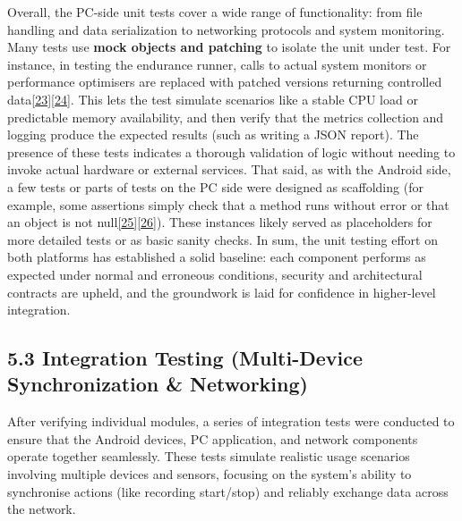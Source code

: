 \documentclass[12pt,a4paper]{article}
\begin{document}
Overall, the PC-side unit tests cover a wide range of functionality: from file handling and data serialization to networking protocols and system monitoring. Many tests use \textbf{mock objects and patching} to isolate the unit under test. For instance, in testing the endurance runner, calls to actual system monitors or performance optimisers are replaced with patched versions returning controlled data\href{https://github.com/buccancs/bucika_gsr/blob/7048f7f6a7536f5cd577ed2184800d3dad97fd08/tests/test_endurance_testing.py\#L112-L120}{{[}23{]}}\href{https://github.com/buccancs/bucika_gsr/blob/7048f7f6a7536f5cd577ed2184800d3dad97fd08/tests/test_endurance_testing.py\#L140-L148}{{[}24{]}}. This lets the test simulate scenarios like a stable CPU load or predictable memory availability, and then verify that the metrics collection and logging produce the expected results (such as writing a JSON report). The presence of these tests indicates a thorough validation of logic without needing to invoke actual hardware or external services. That said, as with the Android side, a few tests or parts of tests on the PC side were designed as scaffolding (for example, some assertions simply check that a method runs without error or that an object is not null\href{https://github.com/buccancs/bucika_gsr/blob/7048f7f6a7536f5cd577ed2184800d3dad97fd08/AndroidApp/src/test/java/com/multisensor/recording/recording/ConnectionManagerTestSimple.kt\#L42-L50}{{[}25{]}}\href{https://github.com/buccancs/bucika_gsr/blob/7048f7f6a7536f5cd577ed2184800d3dad97fd08/AndroidApp/src/test/java/com/multisensor/recording/network/NetworkQualityMonitorTest.kt\#L84-L92}{{[}26{]}}). These instances likely served as placeholders for more detailed tests or as basic sanity checks. In sum, the unit testing effort on both platforms has established a solid baseline: each component performs as expected under normal and erroneous conditions, security and architectural contracts are upheld, and the groundwork is laid for confidence in higher-level integration.

\subsection{5.3 Integration Testing (Multi-Device Synchronization \& Networking)}\label{integration-testing-multi-device-synchronization-networking}

After verifying individual modules, a series of integration tests were conducted to ensure that the Android devices, PC application, and network components operate together seamlessly. These tests simulate realistic usage scenarios involving multiple devices and sensors, focusing on the system's ability to synchronise actions (like recording start/stop) and reliably exchange data across the network.
\end{document}
